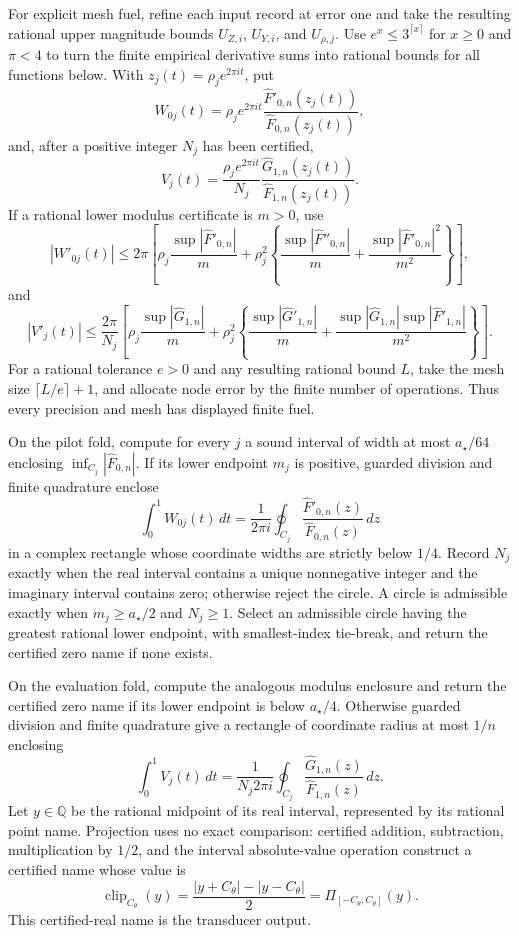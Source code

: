 For explicit mesh fuel, refine each input record at error one and take the resulting rational upper magnitude bounds \(U_{Z,i}\), \(U_{Y,i}\), and \(U_{\rho,j}\).  Use \(e^x\le3^{\lceil x\rceil}\) for \(x\ge0\) and \(\pi<4\) to turn the finite empirical derivative sums into rational bounds for all functions below.  With \(z_j(t)=\rho_je^{2\pi it}\), put
\[
 W_{0j}(t)=
 \rho_je^{2\pi it}
 \frac{\widehat F'_{0,n}(z_j(t))}
      {\widehat F_{0,n}(z_j(t))},
\]
and, after a positive integer \(N_j\) has been certified,
\[
 V_j(t)=
 \frac{\rho_je^{2\pi it}}{N_j}
 \frac{\widehat G_{1,n}(z_j(t))}
      {\widehat F_{1,n}(z_j(t))}.
\]
If a rational lower modulus certificate is \(m>0\), use
\[
 |W'_{0j}(t)|\le
 2\pi\left[
 \rho_j\frac{\sup|\widehat F'_{0,n}|}{m}
 +\rho_j^2\left\{
 \frac{\sup|\widehat F''_{0,n}|}{m}
 +\frac{\sup|\widehat F'_{0,n}|^2}{m^2}
 \right\}\right],
\]
and
\[
 |V'_j(t)|\le
 \frac{2\pi}{N_j}\left[
 \rho_j\frac{\sup|\widehat G_{1,n}|}{m}
 +\rho_j^2\left\{
 \frac{\sup|\widehat G'_{1,n}|}{m}
 +\frac{\sup|\widehat G_{1,n}|\sup|\widehat F'_{1,n}|}{m^2}
 \right\}\right].
\]
For a rational tolerance \(e>0\) and any resulting rational bound \(L\), take the mesh size \(\lceil L/e\rceil+1\), and allocate node error by the finite number of operations.  Thus every precision and mesh has displayed finite fuel.

On the pilot fold, compute for every \(j\) a sound interval of width at most \(a_{\star}/64\) enclosing \(\inf_{C_j}|\widehat F_{0,n}|\).  If its lower endpoint \(m_j\) is positive, guarded division and finite quadrature enclose
\[
 \int_0^1W_{0j}(t)\,dt
 =\frac{1}{2\pi i}\oint_{C_j}
   \frac{\widehat F'_{0,n}(z)}{\widehat F_{0,n}(z)}\,dz
\]
in a complex rectangle whose coordinate widths are strictly below \(1/4\).  Record \(N_j\) exactly when the real interval contains a unique nonnegative integer and the imaginary interval contains zero; otherwise reject the circle.  A circle is admissible exactly when \(m_j\ge a_{\star}/2\) and \(N_j\ge1\).  Select an admissible circle having the greatest rational lower endpoint, with smallest-index tie-break, and return the certified zero name if none exists.

On the evaluation fold, compute the analogous modulus enclosure and return the certified zero name if its lower endpoint is below \(a_{\star}/4\).  Otherwise guarded division and finite quadrature give a rectangle of coordinate radius at most \(1/n\) enclosing
\[
 \int_0^1V_j(t)\,dt
 =\frac{1}{N_j2\pi i}\oint_{C_j}
   \frac{\widehat G_{1,n}(z)}{\widehat F_{1,n}(z)}\,dz.
\]
Let \(y\in\mathbb Q\) be the rational midpoint of its real interval, represented by its rational point name.  Projection uses no exact comparison: certified addition, subtraction, multiplication by \(1/2\), and the interval absolute-value operation construct a certified name whose value is
\[
 \operatorname{clip}_{C_{\theta}}(y)
 =\frac{|y+C_{\theta}|-|y-C_{\theta}|}{2}
 =\Pi_{[-C_{\theta},C_{\theta}]}(y).
\]
This certified-real name is the transducer output.

